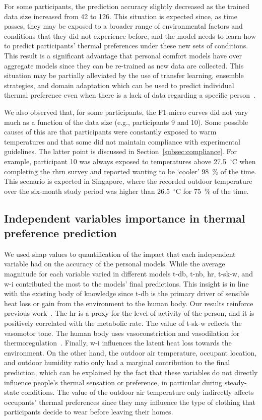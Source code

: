 For some participants, the prediction accuracy slightly decreased as the trained data size increased from 42 to 126. 
This situation is expected since, as time passes, they may be exposed to a broader range of environmental factors and conditions that they did not experience before, and the model needs to learn how to predict participants' thermal preferences under these new sets of conditions.
This result is a significant advantage that personal comfort models have over aggregate models since they can be re-trained as new data are collected.
This situation may be partially alleviated by the use of transfer learning, ensemble strategies, and domain adaptation which can be used to predict individual thermal preference even when there is a lack of data regarding a specific person~\cite{Park2022, Das2021}.

We also observed that, for some participants, the F1-micro curves did not vary much as a function of the data size (e.g., participants 9 and 10).
Some possible causes of this are that participants were constantly exposed to warm temperatures and that some did not maintain compliance with experimental guidelines.
The latter point is discussed in Section~\ref{subsec:compliance}.
For example, participant 10 was always exposed to temperatures above 27.5~$^{\circ}$C when completing the \ac{rhrn} survey and reported wanting to be `cooler' 98~\% of the time.
This scenario is expected in Singapore, where the recorded outdoor temperature over the six-month study period was higher than 26.5~$^{\circ}$C for 75~\% of the time.

\subsection{Independent variables importance in thermal preference prediction}\label{subsec:features}
We used \gls{shap} values to quantification of the impact that each independent variable had on the accuracy of the personal models.
While the average magnitude for each variable varied in different models \acf{t-db}, \acf{t-nb}, \acf{hr}, \acf{t-sk-w}, and \acf{w-i} contributed the most to the models' final predictions.
This insight is in line with the existing body of knowledge since \ac{t-db} is the primary driver of sensible heat loss or gain from the environment to the human body.
Our results reinforce previous work~\cite{Liu2019a}.
The \ac{hr} is a proxy for the level of activity of the person, and it is positively correlated with the metabolic rate.
The value of \ac{t-sk-w} reflects the vasomotor tone. 
The human body uses vasoconstriction and vasodilation for thermoregulation~\cite{Romanovsky2018}.
Finally, \ac{w-i} influences the latent heat loss towards the environment.
On the other hand, the outdoor air temperature, occupant location, and outdoor humidity ratio only had a marginal contribution to the final prediction, which can be explained by the fact that these variables do not directly influence people's thermal sensation or preference, in particular during steady-state conditions.
The value of the outdoor air temperature only indirectly affects occupants' thermal preferences since they may influence the type of clothing that participants decide to wear before leaving their homes.

